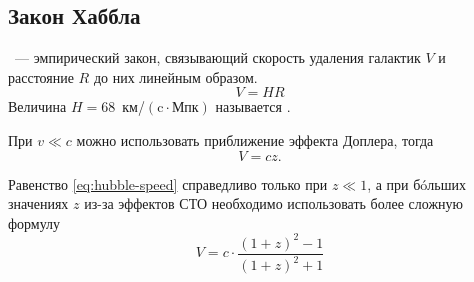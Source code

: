 \subsection{Закон Хаббла}
~--- эмпирический закон, связывающий скорость удаления галактик $V$ и расстояние $R$ до них линейным образом. 
\begin{equation}
	V = H R
\end{equation}
Величина $H=68$~км/$(\text{c} \cdot \text{Мпк})$ называется .

При $v \ll c$ можно использовать приближение эффекта Доплера, тогда
\begin{equation}
	V = c z.
\label{eq:hubble-speed}
\end{equation}

Равенство \eqref{eq:hubble-speed} справедливо только при $z \ll 1$, а при б\'{o}льших значениях $z$ из-за эффектов СТО необходимо использовать более сложную формулу 
\begin{equation}
	V = c \cdot \frac{(1 + z)^2 - 1}{(1 + z)^2 + 1}
\end{equation}